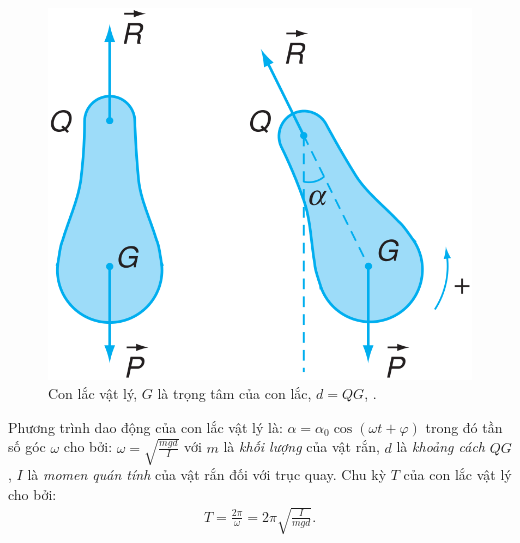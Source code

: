 \documentclass{article}
\numberwithin{equation}{section}
\begin{document}
\begin{figure}[H]
	\centering
	\includegraphics[scale=0.15]{con_lac_vat_ly}
	\caption{Con lắc vật lý, $G$ là trọng tâm của con lắc, $d = QG$, \cite[Hình 7.3]{SGK_Vat_Ly_12_nang_cao}.}
	\label{fig:con_lac_vat_ly}
\end{figure}
Phương trình dao động của con lắc vật lý là: $\alpha = \alpha_0\cos(\omega t + \varphi)$ trong đó tần số góc $\omega$ cho bởi: $\omega = \sqrt{\frac{mgd}{I}}$ với $m$ là \textit{khối lượng} của vật rắn, $d$ là \textit{khoảng cách} $QG$, $I$ là \textit{momen quán tính} của vật rắn đối với trục quay. Chu kỳ $T$ của con lắc vật lý cho bởi:
\begin{align}
	\label{SGK_Vat_Ly_12_nang_cao (7.13)}
	T = \frac{2\pi}{\omega} = 2\pi\sqrt{\frac{I}{mgd}}.
\end{align}
\end{document}
